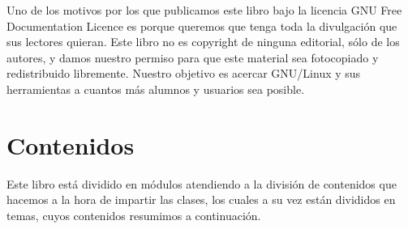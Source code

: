 Uno de los motivos por los  que publicamos este libro bajo la licencia
GNU Free  Documentation Licence es  porque queremos que tenga  toda la
divulgación que  sus lectores quieran.  Este libro no es  copyright de
ninguna editorial, sólo  de los autores, y damos  nuestro permiso para
que este material sea  fotocopiado y redistribuido libremente. Nuestro
objetivo es acercar GNU/Linux y sus herramientas a cuantos más alumnos
y usuarios sea posible.

\section*{Contenidos}

Este  libro está  dividido  en  módulos atendiendo  a  la división  de
contenidos que hacemos a la hora  de impartir las clases, los cuales a
su  vez  están  divididos  en  temas,  cuyos  contenidos  resumimos  a
continuación.

